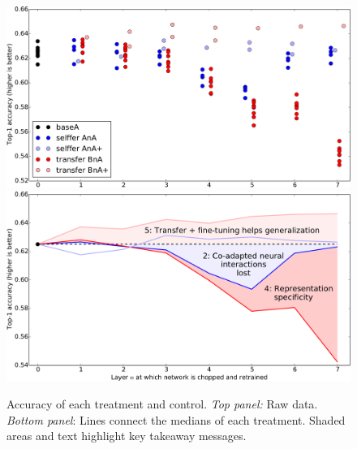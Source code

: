 \begin{figure}[htpb]
\begin{center}
\includegraphics[width=1\linewidth]{plots/result_transfer_crop.pdf}
\includegraphics[width=1\linewidth]{plots/result_transfer_lines_crop.pdf}
\end{center}
\caption{Accuracy of each treatment and control. \emph{Top panel:} Raw data. \emph{Bottom panel}: Lines connect the medians of each treatment. Shaded areas and text highlight key takeaway messages. 
}
\label{fig:results}
\end{figure}

